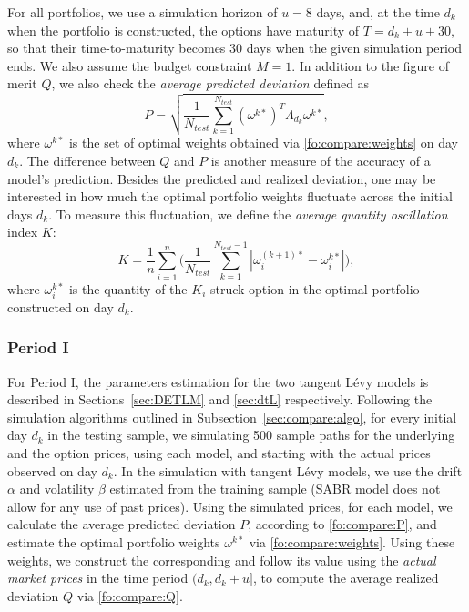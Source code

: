\documentclass{article}
\numberwithin{equation}{section}
\begin{document}
For all portfolios, we use a simulation horizon of $u=8$ days, and, at the time $d_k$ when the portfolio is constructed, the options have maturity of $T=d_k+u+30$, so that their time-to-maturity becomes $30$ days when the given simulation period ends. We also assume the budget constraint $M=1$. In addition to the figure of merit $Q$, we also check the \textit{average predicted deviation} defined as
\begin{equation}\label{fo:compare:P}
P = \sqrt{\frac{1}{N_{test}} \sum_{k=1}^{N_{test}} (\omega^{k*})^T \Lambda_{d_k} \omega^{k*}},
\end{equation}
where $\omega^{k*}$ is the set of optimal weights obtained via \eqref{fo:compare:weights} on day $d_k$. The difference between $Q$ and $P$ is another measure of the accuracy of a model's prediction. 
Besides the predicted and realized deviation, one may be interested in how much the optimal portfolio weights fluctuate across the initial days $d_k$. To measure this fluctuation, we define the \emph{average quantity oscillation} index $K$:
\begin{equation}\label{fo:compare:K}
K = \frac{1}{n}\sum_{i=1}^{n}\bigg(\frac{1}{N_{test}} \sum_{k=1}^{N_{test}-1} \left|\omega_i^{(k+1)*} - \omega_i^{k*}\right|\bigg), 
\end{equation}
where $\omega_i^{k*}$ is the quantity of the $K_i$-struck option in the optimal portfolio constructed on day $d_k$.




\subsubsection{Period I}
\label{subse:part1}


For Period I, the parameters estimation for the two tangent L\'{e}vy models is described in Sections~\ref{sec:DETLM} and \ref{sec:dtL} respectively. Following the simulation algorithms outlined in Subsection~\ref{sec:compare:algo}, for every initial day $d_k$ in the testing sample, we simulating 500 sample paths for the underlying and the option prices, using each model, and starting with the actual prices observed on day $d_k$. In the simulation with tangent L\'evy models, we use the drift $\alpha$ and volatility $\beta$ estimated from the training sample (SABR model does not allow for any use of past prices). Using the simulated prices, for each model, we calculate the average predicted deviation $P$, according to \eqref{fo:compare:P}, and estimate the optimal portfolio weights $\omega^{k*}$ via \eqref{fo:compare:weights}. Using these weights, we construct the corresponding and follow its value using the \emph{actual market prices} in the time period $(d_k,d_k+u]$, to compute the average realized deviation $Q$ via  \eqref{fo:compare:Q}.
\end{document}
